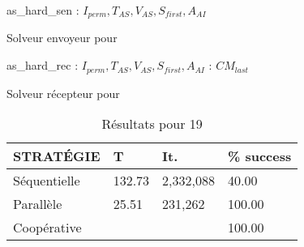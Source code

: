 \begin{algorithm}[!h]
\dontprintsemicolon
\SetNoline
{}
   as\_hard\_sen\;
\algoindent{} : $I_{perm}, T_{AS}, V_{AS}, S_{first}, A_{AI}$ \;
\caption{Solveur envoyeur pour \CARRP}\label{as:costas_sender}
\end{algorithm}

\begin{algorithm}[!h]
\dontprintsemicolon
\SetNoline
{}
   as\_hard\_rec\;
\algoindent{} : $I_{perm}, T_{AS}, V_{AS}, S_{first}, A_{AI}$ \; 
\algoindent{}: $CM_{last}$\;
\caption{Solveur récepteur pour \CARRP}\label{as:costas_receiver}
\end{algorithm}

\begin{table}[!h]
\captionsetup{belowskip=6pt,aboveskip=6pt}
\centering
\renewcommand{\arraystretch}{1}
\begin{tabular}{p{3.2cm}|R{1.2cm}R{1.7cm}R{1.7cm}}
	\hline
	{\bf STRATÉGIE} & T & It. & \% success\\
	\hline
	Séquentielle  & 132.73 & 2,332,088 & 40.00\\
	Parallèle & 25.51 & 231,262 & 100.00\\
	Coopérative &  &  & 100.00\\
	\hline
\end{tabular}
\caption{Résultats pour \CARRP{} 19}
\label{tab:costas19}
\end{table}

